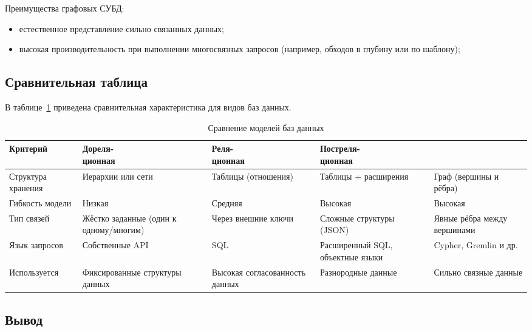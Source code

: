 Преимущества графовых СУБД:
\begin{itemize}
    \item естественное представление сильно связанных данных;
    \item высокая производительность при выполнении многосвязных запросов (например, обходов в глубину или по шаблону);
\end{itemize}

\subsection{Сравнительная таблица}

В таблице~\ref{tbl:db_models} приведена сравнительная характеристика для видов баз данных.

\begin{table}[H]
	\begin{center}
		\begin{threeparttable}
			\caption{Сравнение моделей баз данных}
			\label{tbl:db_models}
			\begin{tabular}{|p{3cm}|p{3.5cm}|p{2.1cm}|p{2.9cm}|p{2.6cm}|}
				\hline
				Критерий & \makecell{Дореля-\\ционная} & \makecell{Реля-\\ционная} & \makecell{Постреля-\\ционная} & \makecell{Графовая} \\
				\hline
				Структура хранения & Иерархии или сети & Таблицы (отношения) & Таблицы + расширения & Граф (вершины и рёбра) \\
				\hline
				Гибкость модели & Низкая & Средняя & Высокая & Высокая \\
				\hline
				Тип связей & Жёстко заданные (один к одному/многим) & Через внешние ключи & Сложные структуры (JSON) & Явные рёбра между вершинами \\
				\hline
				Язык запросов & Собственные API & SQL & Расширенный SQL, объектные языки & Cypher, Gremlin и др. \\
				\hline
				Используется & Фиксированные структуры данных & Высокая согласованность данных & Разнородные данные & Сильно связные данные \\
				\hline
			\end{tabular}
		\end{threeparttable}
	\end{center}
\end{table}

\subsection{Вывод}

